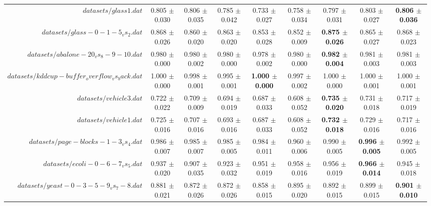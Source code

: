 \begin{table}[!ht]
{\begin{tabular}{r c c c c c c c c}
$datasets/glass1.dat$ & 0.805 $\pm$ 0.030 & 0.806 $\pm$ 0.035 & 0.785 $\pm$ 0.042 & 0.733 $\pm$ 0.027 & 0.758 $\pm$ 0.034 & 0.797 $\pm$ 0.031 & 0.803 $\pm$ 0.027 & \textbf{0.806 $\pm$ 0.036} \\
$datasets/glass-0-1-5_vs_2.dat$ & 0.868 $\pm$ 0.026 & 0.860 $\pm$ 0.020 & 0.863 $\pm$ 0.020 & 0.853 $\pm$ 0.028 & 0.852 $\pm$ 0.009 & \textbf{0.875 $\pm$ 0.026} & 0.865 $\pm$ 0.027 & 0.868 $\pm$ 0.023 \\
$datasets/abalone-20_vs_8-9-10.dat$ & 0.980 $\pm$ 0.000 & 0.980 $\pm$ 0.002 & 0.980 $\pm$ 0.000 & 0.978 $\pm$ 0.002 & 0.980 $\pm$ 0.000 & \textbf{0.982 $\pm$ 0.004} & 0.981 $\pm$ 0.003 & 0.981 $\pm$ 0.003 \\
$datasets/kddcup-buffer_overflow_vs_back.dat$ & 1.000 $\pm$ 0.000 & 0.998 $\pm$ 0.001 & 0.995 $\pm$ 0.001 & \textbf{1.000 $\pm$ 0.000} & 0.997 $\pm$ 0.002 & 1.000 $\pm$ 0.000 & 1.000 $\pm$ 0.001 & 1.000 $\pm$ 0.001 \\
$datasets/vehicle3.dat$ & 0.722 $\pm$ 0.022 & 0.709 $\pm$ 0.009 & 0.694 $\pm$ 0.019 & 0.687 $\pm$ 0.033 & 0.608 $\pm$ 0.052 & \textbf{0.735 $\pm$ 0.020} & 0.731 $\pm$ 0.018 & 0.717 $\pm$ 0.019 \\
$datasets/vehicle1.dat$ & 0.725 $\pm$ 0.016 & 0.707 $\pm$ 0.016 & 0.693 $\pm$ 0.016 & 0.687 $\pm$ 0.033 & 0.608 $\pm$ 0.052 & \textbf{0.732 $\pm$ 0.018} & 0.729 $\pm$ 0.016 & 0.717 $\pm$ 0.016 \\
$datasets/page-blocks-1-3_vs_4.dat$ & 0.986 $\pm$ 0.007 & 0.985 $\pm$ 0.007 & 0.985 $\pm$ 0.005 & 0.984 $\pm$ 0.011 & 0.960 $\pm$ 0.006 & 0.990 $\pm$ 0.005 & \textbf{0.996 $\pm$ 0.005} & 0.992 $\pm$ 0.005 \\
$datasets/ecoli-0-6-7_vs_5.dat$ & 0.937 $\pm$ 0.020 & 0.907 $\pm$ 0.035 & 0.923 $\pm$ 0.032 & 0.951 $\pm$ 0.019 & 0.958 $\pm$ 0.016 & 0.956 $\pm$ 0.019 & \textbf{0.966 $\pm$ 0.014} & 0.945 $\pm$ 0.018 \\
$datasets/yeast-0-3-5-9_vs_7-8.dat$ & 0.881 $\pm$ 0.021 & 0.872 $\pm$ 0.026 & 0.872 $\pm$ 0.026 & 0.858 $\pm$ 0.015 & 0.895 $\pm$ 0.020 & 0.892 $\pm$ 0.015 & 0.899 $\pm$ 0.015 & \textbf{0.901 $\pm$ 0.010} \\
\end{tabular}}
\end{table}
